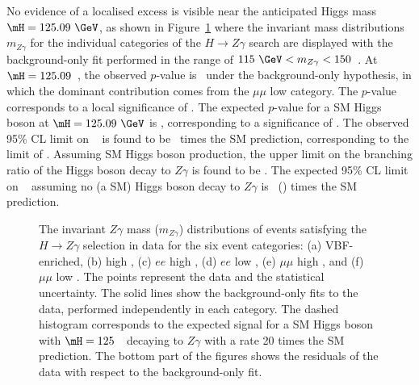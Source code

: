 No evidence of a localised excess is visible near the anticipated
Higgs mass $\mH=125.09~\GeV$, 
as shown in Figure~\ref{fig:mllg-low-mass} where the invariant
mass distributions $m_{Z\gamma}$ for the individual categories of the $H\to Z\gamma$ search are
displayed with the background-only fit performed in the range of $115~\GeV < m_{Z\gamma} < 150$~\GeV.
At $\mH = 125.09$~\GeV, the observed $p$-value is \lowmassmHpz\ under the background-only hypothesis, 
in which the dominant contribution
comes from the $\mu\mu$ low \ptt category. The $p$-value corresponds to a local significance of 
\lowmassmHsignificance. 
The expected $p$-value for a SM Higgs boson at $\mH=125.09~\GeV$ is \lowmassmHpzExpSMHiggs, corresponding
to a significance of \lowmassmHsignificanceExpSMHiggs.
The observed 95\% CL limit on \sighbr~ 
is found to be \mhObserved~times the SM prediction, corresponding to
the limit of \mhObservedxsBr. Assuming SM Higgs boson production, the upper limit on
the branching ratio of the Higgs boson decay to $Z\gamma$ is found to be \mhObservedBr.
The expected 95\% CL limit on \sighbr~ assuming no (a SM) Higgs boson decay to $Z\gamma$ is 
\mhExpected\ (\mhExpectedSMHiggs) times the SM prediction.

\begin{figure}
\begin{center}
%
%
%
\end{center}
\caption{The invariant $Z\gamma$ mass ($m_{Z\gamma}$) distributions of events satisfying the 
$H\to Z\gamma$ selection in data for the six event categories:
(a) VBF-enriched, (b) high \ptg, (c) $ee$ high \ptt,  
(d) $ee$ low \ptt, (e) $\mu\mu$ high \ptt, and (f) $\mu\mu$ low \ptt.
The points represent the data and the statistical uncertainty. The solid lines show the 
background-only fits to the data, performed independently in each category.
The dashed histogram corresponds to the expected signal
for a SM Higgs boson with $\mH = 125$~\GeV\ 
decaying to $Z\gamma$ with a rate 20 times the SM prediction.
The bottom part of the figures shows the residuals of the data with respect to the background-only fit.
}
\label{fig:mllg-low-mass}
\end{figure}


